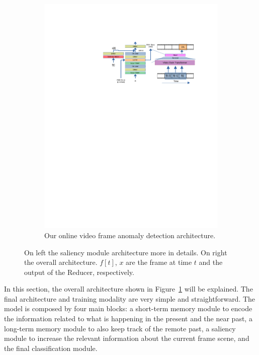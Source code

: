 \begin{figure}[!ht]
\begin{subfigure}{0.7\linewidth}
            \includegraphics[trim=205 500 80 130, clip, width=1.\linewidth]{images/arch.pdf}
        \caption{Our online video frame anomaly detection architecture.}
		\label{fig:arch}
	\end{subfigure}
	\caption{On left the saliency module architecture more in details. On right the overall architecture. $f[t]$, $x$ are the frame at time $t$ and the output of the Reducer, respectively.}
	\label{fig:our-arch}
\end{figure}

In this section, the overall architecture shown in Figure~\ref{fig:arch} will be explained.
The final architecture and training modality are very simple and straightforward. 
The model is composed by four main blocks: a short-term memory module to encode the information related to what is happening in the present and the near past, a long-term memory module to also keep track of the remote past, a saliency module to increase the relevant information about the current frame scene, and the final classification module. 

